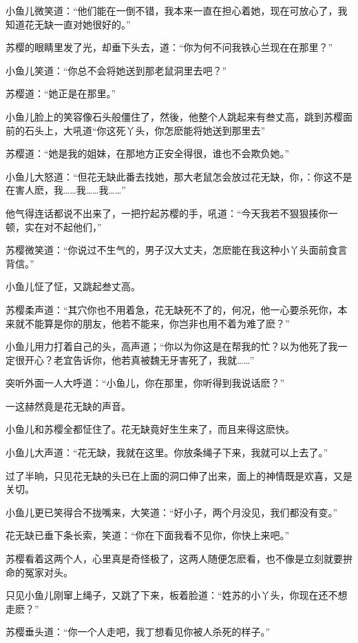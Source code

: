 \documentclass[12pt,oneside]{book}
\begin{document}
小鱼儿微笑道：``他们能在一倒不错，我本来一直在担心着她，现在可放心了，我知道花无缺一直对她很好的。''

苏樱的眼睛里发了光，却垂下头去，道：``你为何不问我铁心兰现在在那里？''

小鱼儿笑道：``你总不会将她送到那老鼠洞里去吧？''

苏樱道：``她正是在那里。''

小鱼儿脸上的笑容像石头般僵住了，然後，他整个人跳起来有叁丈高，跳到苏樱面前的石头上，大吼道``你这死丫头，你怎麽能将她送到那里去''

苏樱道：``她是我的姐妹，在那地方正安全得很，谁也不会欺负她。''

小鱼儿大怒道：``但花无缺此番去找她，那大老鼠怎会放过花无缺，你，：你这不是在害人麽，我\ldots\ldots 我\ldots\ldots 我\ldots\ldots{}''

他气得连话都说不出来了，一把拧起苏樱的手，吼道：``今天我若不狠狠揍你一顿，实在对不起他们，''

苏樱微笑道：``你说过不生气的，男子汉大丈夫，怎麽能在我这种小丫头面前食言背信。''

小鱼儿怔了怔，又跳起叁丈高。

苏樱柔声道：``其穴你也不用着急，花无缺死不了的，何况，他一心要杀死你，本来就不能算是你的朋友，他若不能来，你岂非也用不着为难了麽？''

小鱼儿用力打着自己的头，高声道；``你以为你这是在帮我的忙？以为他死了我一定很开心？老宜告诉你，他若真被魏无牙害死了，我就\ldots\ldots{}''

突听外面一人大呼道：``小鱼儿，你在那里，你听得到我说话麽？''

一这赫然竟是花无缺的声音。

小鱼儿和苏樱全都怔住了。花无缺竟好生生来了，而且来得这麽快。

小鱼儿大声道：``花无缺，我就在这里。你放条绳子下来，我就可以上去了。''

过了半晌，只见花无缺的头已在上面的洞口伸了出来，面上的神情既是欢喜，又是关切。

小鱼儿更已笑得合不拢嘴来，大笑道：``好小子，两个月没见，我们都没有变。''

花无缺已垂下条长索，笑道：``你在下面我看不见你，你快上来吧。''

苏樱看着这两个人，心里真是奇怪极了，这两人随便怎麽看，也不像是立刻就要拚命的冤家对头。

只见小鱼儿刚窜上绳子，又跳了下来，板着脸道：``姓苏的小丫头，你现在还不想走麽？''

苏樱垂头道：``你一个人走吧，我丁想看见你被人杀死的样子。''
\end{document}
